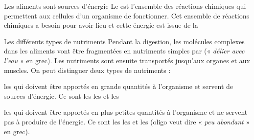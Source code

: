 \tetePremStssBiom
{}

\begin{doc}{Les aliments sont sources d'énergie}
  Le  est l'ensemble des réactions chimiques qui permettent aux cellules d'un organisme de fonctionner.
  Cet ensemble de réactions chimiques a besoin  pour avoir lieu et cette énergie est issue de la 
\end{doc}

\begin{doc}{Les différents types de nutriments}
  Pendant la digestion, les molécules complexes dans les aliments vont être fragmentées en nutriments simples par  (« \textit{délier avec l'eau} » en grec).
  Les nutriments sont ensuite transportés jusqu'aux organes et aux muscles.
  On peut distinguer deux types de nutriments :
  \begin{listePoints}
    \item les  qui doivent être apportés en grande quantités à l'organisme et servent de sources d'énergie. Ce sont les  les  et les 
    \item les  qui doivent être apportés en plus petites quantités à l'organisme et ne servent pas à produire de l'énergie.
    Ce sont les  les  et les  (oligo veut dire « \textit{peu abondant} » en grec).
  \end{listePoints}
\end{doc}

